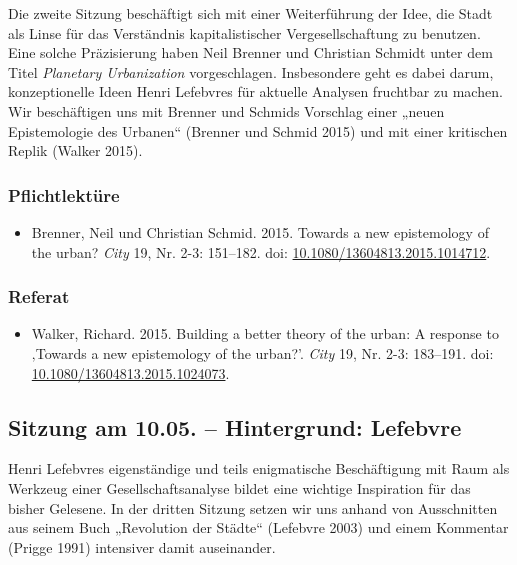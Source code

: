 \documentclass[
  ngerman,
]{article}
\providecommand{\tightlist}{%
  \setlength{\itemsep}{0pt}\setlength{\parskip}{0pt}}
\begin{document}
Die zweite Sitzung beschäftigt sich mit einer Weiterführung der Idee, die Stadt als Linse für das Verständnis kapitalistischer Vergesellschaftung zu benutzen. Eine solche Präzisierung haben Neil Brenner und Christian Schmidt unter dem Titel \emph{Planetary Urbanization} vorgeschlagen. Insbesondere geht es dabei darum, konzeptionelle Ideen Henri Lefebvres für aktuelle Analysen fruchtbar zu machen. Wir beschäftigen uns mit Brenner und Schmids Vorschlag einer „neuen Epistemologie des Urbanen`` (Brenner und Schmid 2015) und mit einer kritischen Replik (Walker 2015).

\hypertarget{pflichtlektuxfcre-1}{%
\subsubsection*{Pflichtlektüre}\label{pflichtlektuxfcre-1}}

\begin{itemize}
\tightlist
\item
  Brenner, Neil und Christian Schmid. 2015. Towards a new epistemology of the urban? \emph{City} 19, Nr. 2-3: 151--182. doi: \href{https://doi.org/10.1080/13604813.2015.1014712}{10.1080/13604813.2015.1014712}.
\end{itemize}

\hypertarget{referat-1}{%
\subsubsection*{Referat}\label{referat-1}}

\begin{itemize}
\tightlist
\item
  Walker, Richard. 2015. Building a better theory of the urban: A response to ‚Towards a new epistemology of the urban?'. \emph{City} 19, Nr. 2-3: 183--191. doi: \href{https://doi.org/10.1080/13604813.2015.1024073}{10.1080/13604813.2015.1024073}.
\end{itemize}

\hypertarget{sitzung-am-10.05.-hintergrund-lefebvre}{%
\subsection{Sitzung am 10.05. -- Hintergrund: Lefebvre}\label{sitzung-am-10.05.-hintergrund-lefebvre}}

Henri Lefebvres eigenständige und teils enigmatische Beschäftigung mit Raum als Werkzeug einer Gesellschaftsanalyse bildet eine wichtige Inspiration für das bisher Gelesene. In der dritten Sitzung setzen wir uns anhand von Ausschnitten aus seinem Buch „Revolution der Städte`` (Lefebvre 2003) und einem Kommentar (Prigge 1991) intensiver damit auseinander.
\end{document}
